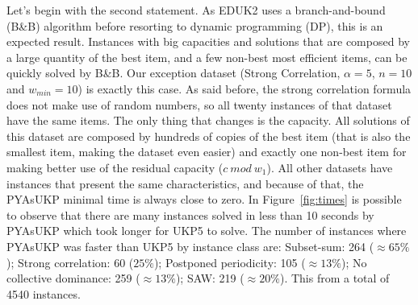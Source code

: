\documentclass[runningheads,a4paper]{llncs}
\begin{document}
Let's begin with the second statement. As EDUK2 uses a branch-and-bound (B\&B) algorithm before resorting to dynamic programming (DP), this is an expected result. 
Instances with big capacities and solutions that are composed by a large quantity of the best item, and a few non-best most efficient items, can be quickly solved by B\&B.
Our exception dataset (Strong Correlation, \(\alpha = 5\), \(n = 10\) and \(w_{min} = 10\)) is exactly this case. As said before, the strong correlation formula does not make use of random numbers, so all twenty instances of that dataset have the same items. 
The only thing that changes is the capacity. All solutions of this dataset are composed by hundreds of copies of the best item (that is also the smallest item, making the dataset even easier) and exactly one non-best item for making better use of the residual capacity (\(c~mod~w_1\)). 
All other datasets have instances that present the same characteristics, and because of that, the PYAsUKP minimal time is always close to zero. In Figure~\ref{fig:times} is possible to observe that there are many instances solved in less than 10 seconds by PYAsUKP which took longer for UKP5 to solve.
The number of instances where PYAsUKP was faster than UKP5 by instance class are: Subset-sum: 264 (\(\approx65\%\)); Strong correlation: 60 (\(25\%\)); Postponed periodicity: 105 (\(\approx13\%\)); No collective dominance: 259 (\(\approx13\%\)); SAW: 219 (\(\approx20\%\)). This from a total of 4540 instances.

\end{document}
